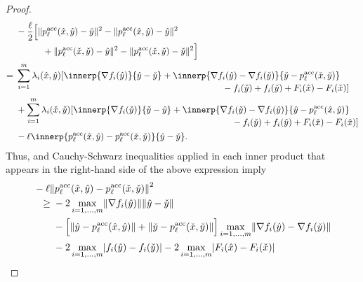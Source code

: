 \documentclass[../main]{subfiles}
\begin{document}
\begin{proof}
\begin{align}
             &- \frac{\ell}{2} 
             \begin{multlined}[t]
                 \Big[  \norm{p^\acc_\ell(\hat{x}, \hat{y}) - \check{y}}^2 - \norm{p^\acc_\ell(\hat{x}, \hat{y}) - \hat{y}}^2 \\
                  + \norm{p^\acc_\ell(\check{x}, \check{y}) - \hat{y}}^2 - \norm{p^\acc_\ell(\check{x}, \check{y}) - \check{y}}^2 \Big]
             \end{multlined} \\
        ={} & \sum_{i = 1}^{m} \lambda_i(\hat{x}, \hat{y})
        \begin{multlined}[t]
            [ \innerp{\nabla f_i(\hat{y})}{\hat{y}- \check{y}} + \innerp{\nabla f_i(\hat{y}) - \nabla f_i(\check{y})}{\check{y} - p^\acc_\ell(\check{x}, \check{y})} \\
            - f_i(\hat{y}) + f_i(\check{y}) + F_i(\hat{x}) - F_i(\check{x}) ] 
        \end{multlined} \\
        &+ \sum_{i = 1}^{m} \lambda_i(\check{x}, \check{y})
        \begin{multlined}[t]
            [ \innerp{\nabla f_i(\check{y})}{\check{y}- \hat{y}} + \innerp{\nabla f_i(\check{y}) - \nabla f_i(\hat{y})}{\hat{y} - p^\acc_\ell(\hat{x}, \hat{y})} \\
            - f_i(\check{y}) + f_i(\hat{y}) + F_i(\check{x}) - F_i(\hat{x}) ]
        \end{multlined} \\
        &- \ell \innerp{p^\acc_\ell(\hat{x}, \hat{y}) - p^\acc_\ell(\check{x}, \check{y})}{\hat{y} - \check{y}}
    .\end{align}
    Thus,  and Cauchy-Schwarz inequalities applied in each inner product that appears in the right-hand side of the above expression imply
    \begin{align}
        \MoveEqLeft - \ell \norm*{p^\acc_\ell(\hat{x}, \hat{y}) - p^\acc_\ell(\check{x}, \check{y})}^2 \\
        \ge{} & - 2 \max_{i = 1, \dots, m} \norm{\nabla f_i(\hat{y})} \norm{\hat{y} - \check{y}} \\
              &- \Big[ \norm{\hat{y} - p^\acc_\ell(\hat{x}, \hat{y})} + \norm{\check{y} - p^\acc_\ell(\check{x}, \check{y})} \Big] \max_{i = 1, \dots, m} \norm{\nabla f_i(\hat{y}) - \nabla f_i(\check{y})} \\
              &- 2 \max_{i = 1, \dots, m} \abs{f_i(\hat{y}) - f_i(\check{y})} - 2 \max_{i = 1, \dots, m} \abs{F_i(\hat{x}) - F_i(\check{x})} \\

\end{align}
\end{proof}
\end{document}
